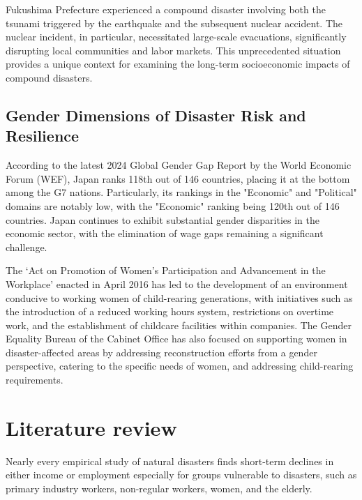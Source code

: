 \documentclass[a4paper,12pt]{article}
\begin{document}
Fukushima Prefecture experienced a compound disaster involving both the tsunami triggered by the earthquake and the subsequent nuclear accident. The nuclear incident, in particular, necessitated large-scale evacuations, significantly disrupting local communities and labor markets. This unprecedented situation provides a unique context for examining the long-term socioeconomic impacts of compound disasters.

\subsection{Gender Dimensions of Disaster Risk and Resilience}
\label{sec5.1}

According to the latest 2024 Global Gender Gap Report by the World Economic Forum (WEF), Japan ranks 118th out of 146 countries, placing it at the bottom among the G7 nations. Particularly, its rankings in the "Economic" and "Political" domains are notably low, with the "Economic" ranking being 120th out of 146 countries. Japan continues to exhibit substantial gender disparities in the economic sector, with the elimination of wage gaps remaining a significant challenge.

The ‘Act on Promotion of Women’s Participation and Advancement in the Workplace’ enacted in April 2016 has led to the development of an environment conducive to working women of child-rearing generations, with initiatives such as the introduction of a reduced working hours system, restrictions on overtime work, and the establishment of childcare facilities within companies. The Gender Equality Bureau of the Cabinet Office has also focused on supporting women in disaster-affected areas by addressing reconstruction efforts from a gender perspective, catering to the specific needs of women, and addressing child-rearing requirements.


\section{Literature review}
\label{sec3}

Nearly every empirical study of natural disasters finds short-term declines in either income or employment especially for groups vulnerable to disasters, such as primary industry workers, non-regular workers, women, and the elderly. 

\end{document}
